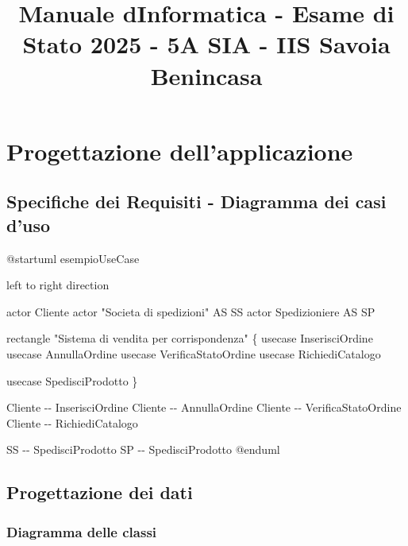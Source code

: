 \documentclass[
]{article}
\title{Manuale d\textquotesingle Informatica - Esame di Stato 2025 - 5A
SIA - IIS Savoia Benincasa}
\author{}
\date{}
\newenvironment{Shaded}{}{}
\newcommand{\NormalTok}[1]{#1}
\begin{document}
\maketitle

{
\setcounter{tocdepth}{6}
\tableofcontents
}
\section{Progettazione
dell'applicazione}\label{progettazione-dellapplicazione}

\subsection{Specifiche dei Requisiti - Diagramma dei casi
d'uso}\label{specifiche-dei-requisiti---diagramma-dei-casi-duso}

\begin{Shaded}
\begin{Highlighting}[]
\NormalTok{@startuml esempioUseCase}

\NormalTok{left to right direction}

\NormalTok{actor Cliente}
\NormalTok{actor "Societa di spedizioni" AS SS}
\NormalTok{actor Spedizioniere AS SP}

\NormalTok{rectangle "Sistema di vendita per corrispondenza" \{}
\NormalTok{  usecase InserisciOrdine}
\NormalTok{  usecase AnnullaOrdine}
\NormalTok{  usecase VerificaStatoOrdine}
\NormalTok{  usecase RichiediCatalogo}
  
\NormalTok{  usecase SpedisciProdotto}
\NormalTok{\}}

\NormalTok{Cliente {-}{-} InserisciOrdine}
\NormalTok{Cliente {-}{-} AnnullaOrdine}
\NormalTok{Cliente {-}{-} VerificaStatoOrdine}
\NormalTok{Cliente {-}{-} RichiediCatalogo}

\NormalTok{SS {-}{-} SpedisciProdotto}
\NormalTok{SP {-}{-} SpedisciProdotto}
\NormalTok{@enduml}
\end{Highlighting}
\end{Shaded}



\subsection{Progettazione dei dati}\label{progettazione-dei-dati}

\subsubsection{Diagramma delle classi}\label{diagramma-delle-classi}
\end{document}
